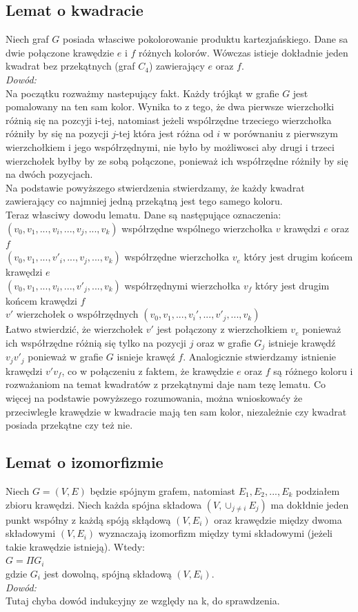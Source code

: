 \documentclass[12pt,a4paper,titlepage]{article}
\begin{document}
\subsection{Lemat o kwadracie}
Niech graf $G$ posiada własciwe pokolorowanie produktu kartezjańskiego. Dane sa dwie połączone krawędzie $e$ i $f$ różnych kolorów. Wówczas istieje dokładnie jeden kwadrat bez przekątnych (graf $C_4$) zawierający $e$ oraz $f$.\\
\textit{Dowód:}\\
Na początku rozważmy nastepujący fakt. Każdy trójkąt w grafie $G$ jest pomalowany na ten sam kolor. Wynika to z tego, że dwa pierwsze wierzchołki różnią się na pozcyji i-tej, natomiast jeżeli wspólrzędne trzeciego wierzchołka różniły by się na pozycji $j$-tej która jest różna od $i$ w porównaniu z pierwszym wierzchołkiem i jego współrzędnymi, nie było by możliwosci aby drugi i trzeci wierzchołek byłby by ze sobą połączone, ponieważ ich współrzędne różniły by się na dwóch pozycjach.\\
Na podstawie powyższego stwierdzenia stwierdzamy, że każdy kwadrat zawierający co najmniej jedną przekątną jest tego samego koloru.\\
Teraz własciwy dowodu lematu. Dane są następujące oznaczenia:\\
$(v_0 , v_1, ... ,v_i, ..., v_j,...,v_k )$  współrzędne wspólnego wierzchołka $v$ krawędzi $e$ oraz $f$\\
$(v_0 , v_1, ... ,v'_i, ..., v_j,...,v_k )$ współrzędne wierzchołka $v_e$ który jest drugim końcem krawędzi $e$\\
$(v_0 , v_1, ... ,v_i, ..., v'_j,...,v_k )$ współrzędnymi wierzchołka $v_f$ który jest drugim końcem krawędzi $f$\\
$v'$ wierzchołek o współrzędnych $(v_0 , v_1, ... ,v_i', ..., v'_j,...,v_k )$\\ 
Łatwo stwierdzić, że wierzchołek $v'$ jest połączony z wierzchołkiem $v_e$ ponieważ ich współrzędne różnią się tylko na pozycji $j$ oraz w grafie $G_j$ istnieje krawędź $v_j v'_j$ ponieważ w grafie $G$ isnieje krawęź $f$. Analogicznie stwierdzamy istnienie krawędzi $v'v_f$, co w połączeniu z faktem, że krawędzie $e$ oraz $f$ są różnego koloru i rozważaniom na temat kwadratów z przekątnymi daje nam tezę lematu. Co więcej na podstawie powyższego rozumowania, można wnioskowaćy że przeciwległe krawędzie w kwadracie mają ten sam kolor, niezależnie czy kwadrat posiada przekątne czy też nie.
\subsection{Lemat o izomorfizmie}
Niech $G=(V, E)$ będzie spójnym grafem, natomiast $E_1 , E_2 , ... , E_k$ podziałem zbioru krawędzi. Niech każda spójna składowa $(V, \cup_{j \neq i}E_j)$ ma dokłdnie jeden punkt współny z każdą spóją skłądową $(V, E_i)$ oraz krawędzie między dwoma składowymi $(V, E_i)$ wyznaczają izomorfizm między tymi składowymi (jeżeli takie krawędzie istnieją). Wtedy:\\
$G=\Pi G_i $ \\
gdzie $G_i $ jest dowolną, spójną składową $(V, E_i)$.\\
\textit{Dowód:}\\
Tutaj chyba dowód indukcyjny ze względy na k, do sprawdzenia. 
\end{document}
